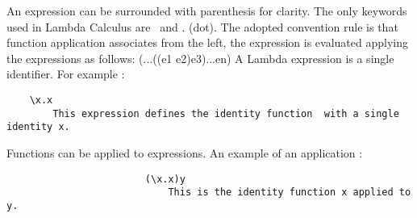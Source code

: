 \documentclass{article}
\begin{document}
 An expression can be surrounded with parenthesis for clarity.
\newline The only keywords used in Lambda Calculus are \ and . (dot).
\newline The adopted convention rule is that function application associates from the left, the expression is evaluated applying the expressions as follows:
\newline \newline \indent (...((e1 e2)e3)...en)
\newline \newline A Lambda expression is a single identifier. 
\newline	For example : 
\begin{lstlisting}
    \x.x 
        This expression defines the identity function  with a single identity x.
\end{lstlisting}   
 Functions can be applied to expressions. 
\newline An example of  an application :
\begin{lstlisting}
                        (\x.x)y
                            This is the identity function x applied to y.
\end{lstlisting} 
\end{document}
